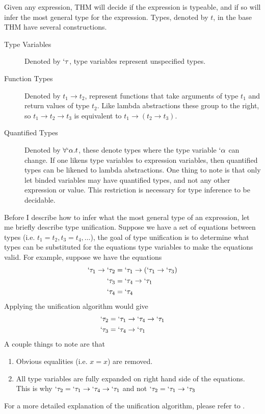 \documentclass[12pt]{article}
\begin{document}
Given any expression, THM will decide if the expression is typeable,
and if so will infer the most general type for the expression.
Types, denoted by $t$, in the base THM have several constructions.
\begin{description}
\item[Type Variables] Denoted by $`\tau$, type variables represent
  unspecified types.

\item[Function Types] Denoted by $t_1 \to t_2$, represent functions
  that take arguments of type $t_1$ and return values of type $t_2$.
  Like lambda abstractions these group to the right, so
  $t_1 \to t_2 \to t_3$ is equivalent to $t_1 \to (t_2 \to t_3)$.

\item[Quantified Types] Denoted by $\forall `\alpha. t$, these denote
  types where the type variable $`\alpha$ can change.
  If one likens type variables to expression variables, then
  quantified types can be likened to lambda abstractions.
  One thing to note is that only let binded variables may have
  quantified types, and not any other expression or value.
  This restriction is necessary for type inference to be decidable.
\end{description}

Before I describe how to infer what the most general type of
an expression, let me briefly describe type unification.
Suppose we have a set of equations between types (i.e.
$t_1 = t_2, t_3 = t_4, \ldots$), the goal of type unification is to
determine what types can be substituted for the equations type
variables to make the equations valid.
For example, suppose we have the equations
\begin{align*}
  `\tau_1 \to `\tau_2 &= `\tau_1 \to (`\tau_1 \to `\tau_3)\\
  `\tau_3 &= `\tau_4 \to `\tau_1\\
  `\tau_4 &= `\tau_4
\end{align*}
Applying the unification algorithm would give
\begin{align*}
  `\tau_2 &= `\tau_1 \to `\tau_4 \to `\tau_1\\
  `\tau_3 &= `\tau_4 \to `\tau_1
\end{align*}
A couple things to note are that
\begin{enumerate}
\item Obvious equalities (i.e. $x = x$) are removed.
  
\item All type variables are fully expanded on right hand side of the
  equations.
  This is why $`\tau_2 = `\tau_1 \to `\tau_4 \to `\tau_1$ and not
  $`\tau_2 = `\tau_1 \to `\tau_3$
\end{enumerate}
For a more detailed explanation of the unification algorithm, please
refer to \cite{Martelli1982AnEU}.
\end{document}
